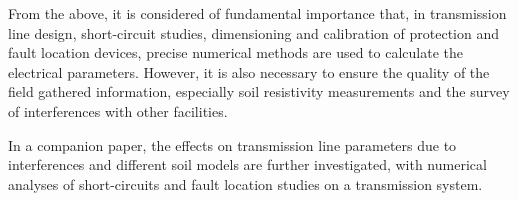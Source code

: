 \documentclass[conference]{IEEEtran}
\begin{document}
From the above, it is considered of fundamental importance that, in transmission line design, short-circuit studies, dimensioning and calibration of protection and fault location devices, precise numerical methods are used to calculate the electrical parameters. However, it is also necessary to ensure the quality of the field gathered information, especially soil resistivity measurements and the survey of interferences with other facilities. 

In a companion paper, the effects on transmission line parameters due to interferences and different soil models are further investigated, with numerical analyses of short-circuits and fault location studies on a transmission system.  




\nocite{*}

\end{document}
